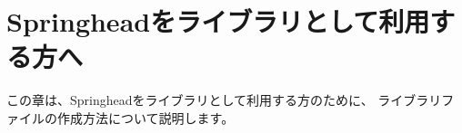 \newpage
\section{Springheadをライブラリとして利用する方へ}
\label{sec:ForNonDevelopper}

\noindent
この章は、Springheadをライブラリとして利用する方のために、
ライブラリファイルの作成方法について説明します。

